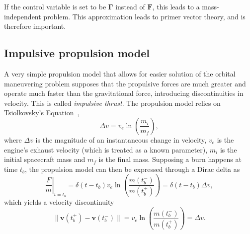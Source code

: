 If the control variable is set to be \(\mathbf{\Gamma}\) instead of \(\mathbf{F}\), this leads to a mass-independent problem. This approximation leads to primer vector theory, and is therefore important. 


\subsection{Impulsive propulsion model}


A very simple propulsion model that allows for easier solution of the orbital maneuvering problem supposes that the propulsive forces are much greater and operate much faster than the gravitational force, introducing discontinuities in velocity. This is called \textit{impulsive thrust}. The propulsion model relies on Tsiolkovsky's Equation~\cite{Conway_2010}, 
\begin{equation}
    \Delta v = v_e \ln{\left(\frac{m_i}{m_f}\right)},
\end{equation}
where \(\Delta v\) is the magnitude of an instantaneous change in velocity, \(v_e\) is the engine's exhaust velocity (which is treated as a known parameter), \(m_i\) is the initial spacecraft mass and \(m_f\) is the final mass. Supposing a burn happens at time \(t_b\), the propulsion model can then be expressed through a Dirac delta as
\begin{equation}
    \left.\frac{F}{m}\right\vert_{t = t_b} = \delta(t - t_b) v_e \ln{\left(\frac{m(t_b^-)}{m(t_b^+)} \right)} = \delta(t - t_b) \Delta v,
\end{equation}
which yields a velocity discontinuity
\begin{equation}
    \lVert \mathbf{v}(t_b^+) - \mathbf{v}(t_b^-) \rVert = v_e \ln{\left(\frac{m(t_b^-)}{m(t_b^+)}\right)} = \Delta v.
\end{equation}

